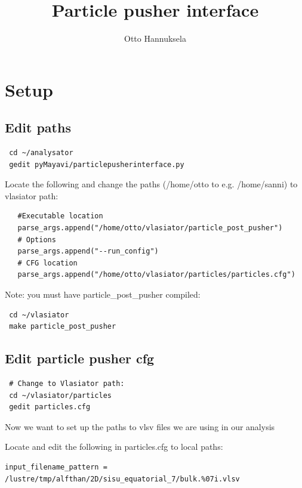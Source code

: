 \documentclass[a4paper,10pt]{article}
\title{Particle pusher interface}
\author{Otto Hannuksela}
\begin{document}
\maketitle

\tableofcontents

\newpage

\section{Setup}

\subsection{Edit paths}

\begin{verbatim}
 cd ~/analysator
 gedit pyMayavi/particlepusherinterface.py
\end{verbatim}

Locate the following and change the paths (/home/otto to e.g. /home/sanni) to vlasiator path:

\begin{verbatim}
   #Executable location
   parse_args.append("/home/otto/vlasiator/particle_post_pusher")
   # Options
   parse_args.append("--run_config")
   # CFG location
   parse_args.append("/home/otto/vlasiator/particles/particles.cfg")
\end{verbatim}

Note: you must have particle\_post\_pusher compiled:

\begin{verbatim}
 cd ~/vlasiator
 make particle_post_pusher
\end{verbatim}


\subsection{Edit particle pusher cfg}

\begin{verbatim}
 # Change to Vlasiator path:
 cd ~/vlasiator/particles
 gedit particles.cfg
\end{verbatim}

Now we want to set up the paths to vlsv files we are using in our analysis

Locate and edit the following in particles.cfg to local paths:

\begin{verbatim}
input_filename_pattern = /lustre/tmp/alfthan/2D/sisu_equatorial_7/bulk.%07i.vlsv
\end{verbatim}
\end{document}
